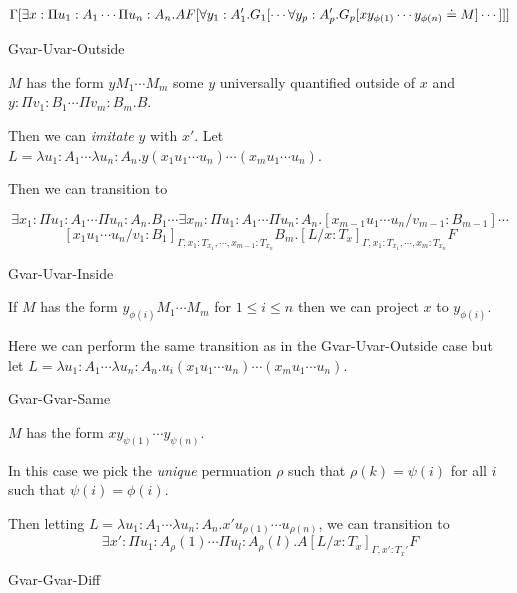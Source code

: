 \[
\Gamma[
\exists x : \Pi u_1 : A_1 \cdots \Pi u_n : A_n . A 
\\
F[\forall y_1 : A'_1 . G_1 
[ \cdots \forall y_p : A'_p . G_p 
[ x y_{\phi(1)} \cdots y_{\phi(n)} \doteq M ]
\cdots
]]]
\]

\begin{tcase}
Gvar-Uvar-Outside
\end{tcase}

$M$ has the form 
$y M_1 \cdots M_m$ some $y$ universally
quantified outside of $x$
and 
$y : \Pi v_1 : B_1 \cdots \Pi v_m : B_m . B$.  

Then we can \textit{imitate} $y$ with $x'$.
Let 
$L = \lambda u_1 : A_1 \cdots \lambda u_n : A_n .
 y (x_1 u_1 \cdots u_n) \cdots (x_m u_1 \cdots u_n)$.

Then we can transition to 

\[
\exists x_1 : \Pi u_1 : A_1 \cdots \Pi u_n : A_n . B_1 \cdots 
\exists x_m : \Pi u_1 : A_1 \cdots \Pi u_n : A_n . 
[x_{m-1}u_1\cdots u_n / v_{m-1} : B_{m-1}]
\cdots 
\]
\[
[x_1 u_1 \cdots u_n / v_1 : B_1]_{\Gamma, x_1:T_{x_1},\cdots, x_{m-1}:T_{x_n}} B_m .
[L / x : T_x ]_{\Gamma, x_1:T_{x_1},\cdots, x_m:T_{x_n}}F
\]

\begin{tcase}
Gvar-Uvar-Inside
\end{tcase}

If $M$ has the form 
$y_{\phi(i)} M_1 \cdots M_m$ for 
$1 \leq i \leq n$ then we can project $x$ to $y_{\phi(i)}$.

Here we can perform the same transition as in the Gvar-Uvar-Outside
case but let 
$L = \lambda u_1 : A_1 \cdots \lambda u_n : A_n .
 u_i (x_1 u_1 \cdots u_n) \cdots (x_m u_1 \cdots u_n)$.

\begin{tcase}
Gvar-Gvar-Same
\end{tcase}

$M$ has the form 
$x y_{\psi(1)} \cdots y_{\psi(n)}$.

In this case we pick the \textit{unique} permuation $\rho$ 
such that $\rho(k) = \psi(i)$ for all $i$ such that $\psi(i) = \phi(i)$.

Then letting
$L = \lambda u_1 : A_1 \cdots \lambda u_n : A_n .
 x' u_{\rho(1)} \cdots u_{\rho(n)} $, 
we can transition to
\[
\exists x' : \Pi u_1 : A_\rho(1) \cdots \Pi u_l : A_\rho(l) . A 
[L / x : T_x ]_{\Gamma, x' : T_x'} F
\] 


\begin{tcase}
Gvar-Gvar-Diff
\end{tcase}


